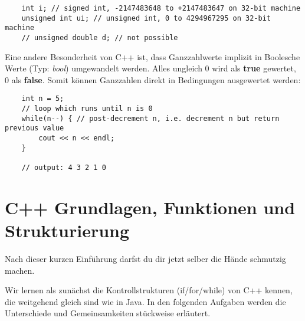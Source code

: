\documentclass[
  accentcolor=tud1c,	%
  colorbacktitle,		%
  inverttitle,			%
  german,				%
  twoside
]{tudexercise}
\begin{document}
\begin{lstlisting}
 	int i; // signed int, -2147483648 to +2147483647 on 32-bit machine
	unsigned int ui; // unsigned int, 0 to 4294967295 on 32-bit machine
	// unsigned double d; // not possible
\end{lstlisting}

Eine andere Besonderheit von C++ ist, dass Ganzzahlwerte implizit in Boolesche Werte (Typ: \emph{bool}) umgewandelt werden.
Alles ungleich 0 wird als \textbf{true} gewertet, 0 als \textbf{false}.
Somit können Ganzzahlen direkt in Bedingungen ausgewertet werden:

\begin{lstlisting}
 	int n = 5;
 	// loop which runs until n is 0
 	while(n--) { // post-decrement n, i.e. decrement n but return previous value
  		cout << n << endl;
 	}

	// output: 4 3 2 1 0
\end{lstlisting}


\section{C++ Grundlagen, Funktionen und Strukturierung}

Nach dieser kurzen Einführung darfst du dir jetzt selber die Hände schmutzig machen.

Wir lernen als zunächst die Kontrollstrukturen (if/for/while) von C++ kennen, die weitgehend gleich sind wie in Java.
In den folgenden Aufgaben werden die Unterschiede und Gemeinsamkeiten stückweise erläutert.
\end{document}

